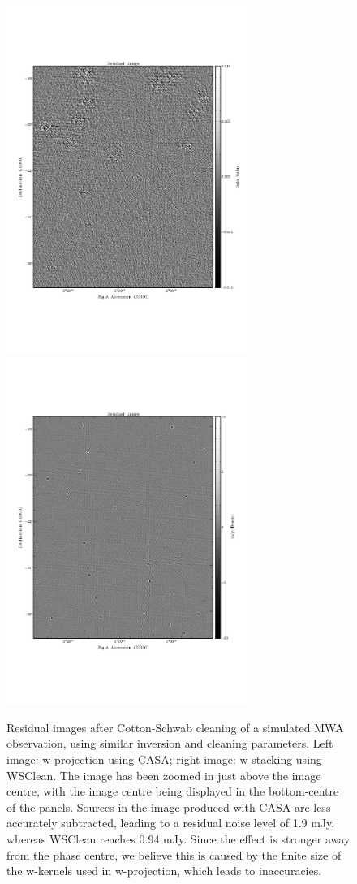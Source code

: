 \documentclass[useAMS,usenatbib]{mn2e}
\begin{document}
\begin{figure}
\begin{center}
\includegraphics[width=8cm]{img/residual-casa}
\includegraphics[width=8cm]{img/residual-wsclean}
\caption{Residual images after Cotton-Schwab cleaning of a simulated MWA observation, using similar inversion and cleaning parameters. Left image: w-projection using CASA; right image: w-stacking using WSClean. The image has been zoomed in just above the image centre, with the image centre being displayed in the bottom-centre of the panels. Sources in the image produced with CASA are less accurately subtracted, leading to a residual noise level of 1.9 mJy, whereas WSClean reaches 0.94 mJy. Since the effect is stronger away from the phase centre, we believe this is caused by the finite size of the w-kernels used in w-projection, which leads to inaccuracies.}
\label{fig:residuals}
\end{center}
\end{figure}
\end{document}
